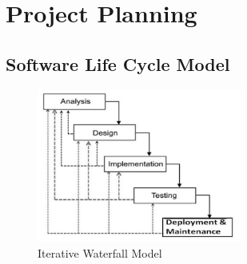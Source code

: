 
\section{Project Planning}

\subsection{Software Life Cycle Model}

\begin{figure}[h!]  
    \centering
    \includegraphics[width=0.6\textwidth]{Images/01 Life_cycle.jpg}  
    \caption*{Iterative Waterfall Model}
    \label{Iterative Waterfall Model}  %
\end{figure}

